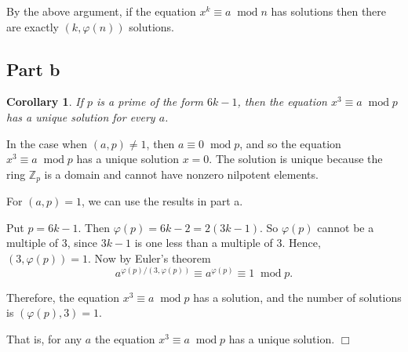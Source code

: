 \documentclass[10pt]{article}
\newtheorem{corollary}[theorem]{Corollary}
\newenvironment{proof}[1][Proof]{\begin{trivlist}
\item[\hskip \labelsep {\bfseries #1}]}{\end{trivlist}}
\newcommand{\modulo}[1]{\;\operatorname{mod} #1}
\begin{document}
    By the above argument, if the equation $x^k\equiv a\modulo{n}$
    has solutions then there are exactly $(k,\varphi(n))$ solutions.
    
    \subsection*{Part b}
    \begin{corollary}
        If $p$ is a prime of the form $6k-1$, then the equation $x^3 \equiv a\modulo{p}$ has a unique solution
        for every $a$.
    \end{corollary}
    \begin{proof}
        In the case when $(a,p)\neq 1$, then $a \equiv 0\modulo{p}$, and so the equation $x^3\equiv a\modulo{p}$ has a unique
        solution $x = 0$. The solution is unique because the ring $\mathbb{Z}_p$ is a domain and cannot have nonzero
        nilpotent elements.
        
        For $(a,p) = 1$, we can use the results in part a.
        
        Put $p = 6k-1$. Then $\varphi(p) = 6k-2 = 2(3k-1)$. So $\varphi(p)$
        cannot be a multiple of $3$, since $3k-1$ is one less than a multiple of
        $3$. Hence, $(3,\varphi(p)) = 1$. Now by Euler's theorem
        \begin{equation*}
            a^{\varphi(p)/(3,\varphi(p))} \equiv a^{\varphi(p)} \equiv 1\modulo{p}.
        \end{equation*}
        
        Therefore, the equation $x^3 \equiv a\modulo{p}$ has a solution,
        and the number of solutions is $(\varphi(p),3) = 1$.
        
        That is, for any $a$ the equation $x^3 \equiv a\modulo{p}$ has a
        unique solution. $\Box$
        
        
    \end{proof}
   
\end{document}
